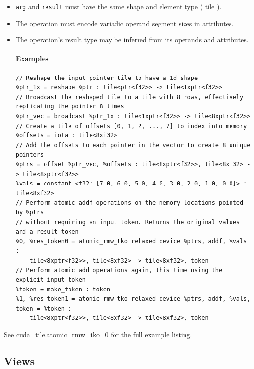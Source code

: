 \documentclass{article}
\begin{document}
\begin{itemize}
\item \texttt{arg} and \texttt{result} must have the same shape and element type ( \href{https://docs.nvidia.com/cuda/tile-ir/latest/sections/types.html#type-tile}{tile} ).
\item The operation must encode variadic operand segment sizes in attributes.
\item The operation's result type may be inferred from its operands and attributes.


\paragraph{Examples}

\begin{lstlisting}
// Reshape the input pointer tile to have a 1d shape
%ptr_1x = reshape %ptr : tile<ptr<f32>> -> tile<1xptr<f32>>
// Broadcast the reshaped tile to a tile with 8 rows, effectively replicating the pointer 8 times
%ptr_vec = broadcast %ptr_1x : tile<1xptr<f32>> -> tile<8xptr<f32>>
// Create a tile of offsets [0, 1, 2, ..., 7] to index into memory
%offsets = iota : tile<8xi32>
// Add the offsets to each pointer in the vector to create 8 unique pointers
%ptrs = offset %ptr_vec, %offsets : tile<8xptr<f32>>, tile<8xi32> -> tile<8xptr<f32>>
%vals = constant <f32: [7.0, 6.0, 5.0, 4.0, 3.0, 2.0, 1.0, 0.0]> : tile<8xf32>
// Perform atomic addf operations on the memory locations pointed by %ptrs
// without requiring an input token. Returns the original values and a result token
%0, %res_token0 = atomic_rmw_tko relaxed device %ptrs, addf, %vals :
    tile<8xptr<f32>>, tile<8xf32> -> tile<8xf32>, token
// Perform atomic add operations again, this time using the explicit input token
%token = make_token : token
%1, %res_token1 = atomic_rmw_tko relaxed device %ptrs, addf, %vals, token = %token :
    tile<8xptr<f32>>, tile<8xf32> -> tile<8xf32>, token
\end{lstlisting}

\end{itemize}
See \href{https://docs.nvidia.com/cuda/tile-ir/latest/sections/appendix.html#example-cuda-tile-atomic-rmw-tko-0}{cuda\_tile.atomic\_rmw\_tko\_0} for the full example listing.




\subsection{Views}
\end{document}
